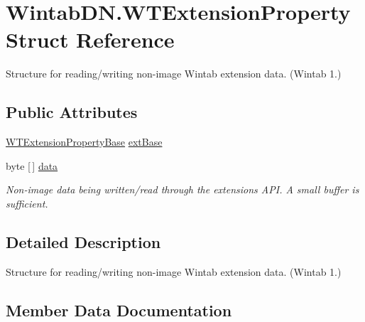 \hypertarget{struct_wintab_d_n_1_1_w_t_extension_property}{}\section{Wintab\+D\+N.\+W\+T\+Extension\+Property Struct Reference}
\label{struct_wintab_d_n_1_1_w_t_extension_property}


Structure for reading/writing non-\/image Wintab extension data. (Wintab 1.)  


\subsection*{Public Attributes}
\begin{DoxyCompactItemize}
\item 
\mbox{\hyperlink{struct_wintab_d_n_1_1_w_t_extension_property_base}{W\+T\+Extension\+Property\+Base}} \mbox{\hyperlink{struct_wintab_d_n_1_1_w_t_extension_property_a4035705d46258a4fcfb82dd981da7f30}{ext\+Base}}
\item 
byte \mbox{[}$\,$\mbox{]} \mbox{\hyperlink{struct_wintab_d_n_1_1_w_t_extension_property_a99b61184d3898a90dcd560dc28ab32b5}{data}}
\begin{DoxyCompactList}\small\item\em Non-\/image data being written/read through the extensions A\+PI. A small buffer is sufficient. \end{DoxyCompactList}\end{DoxyCompactItemize}


\subsection{Detailed Description}
Structure for reading/writing non-\/image Wintab extension data. (Wintab 1.) 



\subsection{Member Data Documentation}
\mbox{\label{struct_wintab_d_n_1_1_w_t_extension_property_a99b61184d3898a90dcd560dc28ab32b5}} 
